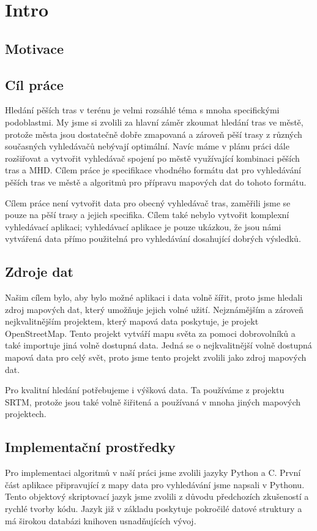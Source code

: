 \chapter{Intro}

\section{Motivace}

\section{Cíl práce}
Hledání pěších tras v terénu je velmi rozsáhlé téma s mnoha specifickými
podoblastmi. My jsme si zvolili za hlavní záměr zkoumat hledání tras ve městě,
protože města jsou dostatečně dobře zmapovaná a zároveň pěší trasy z různých
současných vyhledávačů nebývají optimální. Navíc máme v plánu práci dále
rozšiřovat a vytvořit vyhledávač spojení po městě využívající kombinaci pěších
tras a MHD.  Cílem práce je specifikace vhodného formátu dat pro vyhledávání
pěších tras ve městě a algoritmů pro přípravu mapových dat do tohoto formátu. 

Cílem práce není vytvořit data pro obecný vyhledávač tras, zaměřili jsme se
pouze na pěší trasy a jejich specifika. Cílem také nebylo vytvořit komplexní
vyhledávací aplikaci; vyhledávací aplikace je pouze ukázkou, že jsou námi
vytvářená data přímo použitelná pro vyhledávání dosahující dobrých výsledků.

\section{Zdroje dat}
Našim cílem bylo, aby bylo možné aplikaci i data volně šířit, proto jsme hledali
zdroj mapových dat, který umožňuje jejich volné užití. Nejznámějším a zároveň
nejkvalitnějším projektem, který mapová data poskytuje, je projekt
OpenStreetMap. Tento projekt vytváří mapu světa za pomoci dobrovolníků a také
importuje jiná volně dostupná data. Jedná se o nejkvalitnější volně dostupná
mapová data pro celý svět, proto jsme tento projekt zvolili jako zdroj mapových
dat.

Pro kvalitní hledání potřebujeme i výšková data. Ta používáme z projektu SRTM, protože
jsou také volně šiřitená a používaná v mnoha jiných mapových projektech.


\section{Implementační prostředky}
Pro implementaci algoritmů v naší práci jsme zvolili jazyky Python a C. První část
aplikace připravující z mapy data pro vyhledávání jsme napsali v Pythonu. Tento
objektový skriptovací jazyk jsme zvolili z důvodu předchozích zkušeností a
rychlé tvorby kódu. Jazyk již v základu poskytuje pokročilé datové struktury a
má širokou databázi knihoven usnadňujících vývoj. 

